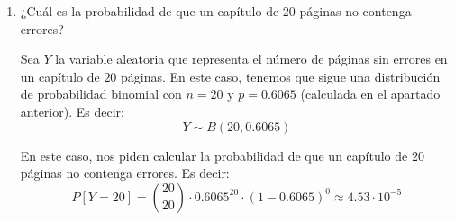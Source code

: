 \begin{ejercicio}
\begin{enumerate}
        \item ¿Cuál es la probabilidad de que un capítulo de $20$ páginas no contenga errores?
        
        Sea $Y$ la variable aleatoria que representa el número de páginas sin errores en un capítulo de $20$ páginas. En este caso, tenemos que sigue una distribución de probabilidad binomial con $n=20$ y $p=0.6065$ (calculada en el apartado anterior). Es decir:
        \begin{equation*}
            Y \sim B(20,0.6065)
        \end{equation*}

        En este caso, nos piden calcular la probabilidad de que un capítulo de $20$ páginas no contenga errores. Es decir:
        \begin{equation*}
            P[Y=20] = \binom{20}{20} \cdot 0.6065^{20} \cdot (1-0.6065)^0 \approx 4.53\cdot 10^{-5}
        \end{equation*}
    \end{enumerate}
\end{ejercicio}


